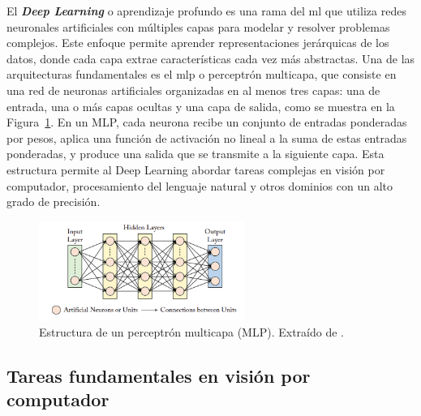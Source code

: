 \documentclass[11pt,spanish,listoffigures,listoftables]{tfgetsinf}
\begin{document}
El \textit{\textbf{Deep Learning}} o aprendizaje profundo es una rama del \gls{ml} que utiliza redes neuronales artificiales con múltiples capas para modelar y resolver problemas complejos. Este enfoque permite aprender representaciones jerárquicas de los datos, donde cada capa extrae características cada vez más abstractas. Una de las arquitecturas fundamentales es el \gls{mlp} o perceptrón multicapa, que consiste en una red de neuronas artificiales organizadas en al menos tres capas: una de entrada, una o más capas ocultas y una capa de salida, como se muestra en la Figura~\ref{fig:multilayer_perceptron}. En un MLP, cada neurona recibe un conjunto de entradas ponderadas por pesos, aplica una función de activación no lineal a la suma de estas entradas ponderadas, y produce una salida que se transmite a la siguiente capa. Esta estructura permite al Deep Learning abordar tareas complejas en visión por computador, procesamiento del lenguaje natural y otros dominios con un alto grado de precisión.


\begin{figure}[H]
   \centering
   \includegraphics[width=0.6\textwidth]{images/estado_del_arte/multilayer_perceptron.png}
      \caption[Estructura de un perceptrón multicapa (MLP)]{Estructura de un perceptrón multicapa (MLP). Extraído de \cite[fig. 3.1, p.~32]{khan2018guide}.}
   \label{fig:multilayer_perceptron}
\end{figure}

\subsection{Tareas fundamentales en visión por computador} \label{sec:tareas_fundamentales_vision_por_computador}
\end{document}
